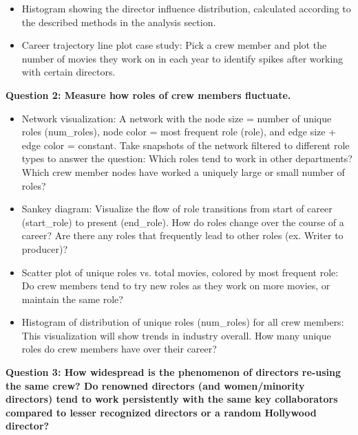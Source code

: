 \documentclass[12pt]{article}
\begin{document}
\begin{itemize}
\item Histogram showing the director influence distribution, calculated according to the described methods in the analysis section.
\item Career trajectory line plot case study: Pick a crew member and plot the number of movies they work on in each year to identify spikes after working with certain directors.
\end{itemize}

\textbf{Question 2: Measure how roles of crew members fluctuate.}

\begin{itemize}
\item Network visualization: A network with the node size = number of unique roles (num\_roles), node color = most frequent role (role), and edge size + edge color = constant. Take snapshots of the network filtered to different role types to answer the question: Which roles tend to work in other departments? Which crew member nodes have worked a uniquely large or small number of roles? 
\item Sankey diagram: Visualize the flow of role transitions from start of career (start\_role) to present (end\_role). How do roles change over the course of a career? Are there any roles that frequently lead to other roles (ex. Writer to producer)? 
\item Scatter plot of unique roles vs. total movies, colored by most frequent role: Do crew members tend to try new roles as they work on more movies, or maintain the same role?
\item Histogram of distribution of unique roles (num\_roles) for all crew members: This visualization will show trends in industry overall. How many unique roles do crew members have over their career?
\end{itemize}


\textbf{Question 3:  How widespread is the phenomenon of directors re-using the same crew? Do renowned directors (and women/minority directors) tend to work persistently with the same key collaborators compared to lesser recognized directors or a random Hollywood director?}
\end{document}
